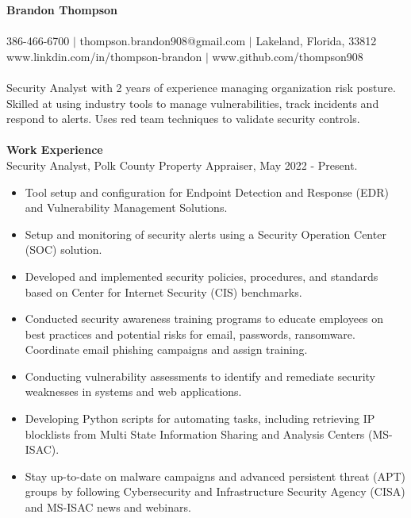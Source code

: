 \documentclass[12pt,a4paper]{article}
\begin{document}
{\centering\textbf{Brandon Thompson}}\\
\\
386-466-6700 $|$ thompson.brandon908@gmail.com $|$ Lakeland, Florida, 33812\\ %
www.linkdin.com/in/thompson-brandon $|$ www.github.com/thompson908
\\
\\
Security Analyst with 2 years of experience managing organization risk posture. Skilled at using industry tools to manage vulnerabilities, track incidents and respond to alerts. Uses red team techniques to validate security controls.
\\
\\
\textbf{Work Experience}\\
Security Analyst, Polk County Property Appraiser, May 2022 - Present.
\begin{itemize}
    \item Tool setup and configuration for Endpoint Detection and Response (EDR) and Vulnerability Management Solutions.
    \item Setup and monitoring of security alerts using a Security Operation Center (SOC) solution.
    \item Developed and implemented security policies, procedures, and standards based on Center for Internet Security (CIS) benchmarks.
    \item Conducted security awareness training programs to educate employees on best practices and potential risks for email, passwords, ransomware. Coordinate email phishing campaigns and assign training.
    \item Conducting vulnerability assessments to identify and remediate security weaknesses in systems and web applications. %
    \item Developing Python scripts for automating tasks, including retrieving IP blocklists from Multi State Information Sharing and Analysis Centers (MS-ISAC).
    \item Stay up-to-date on malware campaigns and advanced persistent threat (APT) groups by following Cybersecurity and Infrastructure Security Agency (CISA) and MS-ISAC news and webinars.
\end{itemize}
\end{document}
